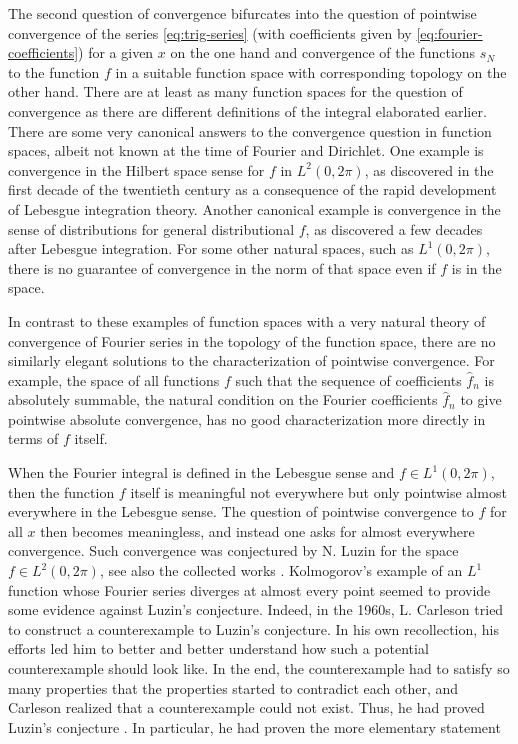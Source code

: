 The second question of convergence bifurcates into the question of pointwise convergence
of the series \eqref{eq:trig-series} (with coefficients given by \eqref{eq:fourier-coefficients}) for a given $x$ on the one hand and convergence of the functions $s_N$ to the function $f$ in a suitable
function space with corresponding topology on the other hand. There are at
least as many function spaces for
the question of convergence as there are different definitions of the integral elaborated earlier.
There are some very
canonical answers to the convergence question in function spaces, albeit not known at the time of Fourier and Dirichlet.
One example is convergence in the Hilbert space sense for $f$ in $L^2(0,2\pi)$,
as discovered in the first decade of the twentieth century
as a consequence of the rapid development of Lebesgue integration theory.
Another canonical example is convergence in the sense of distributions for general distributional $f$, as discovered a few decades after Lebesgue integration. For some other natural spaces, such as $L^1(0,2\pi)$, there is no guarantee of convergence in the
norm of that space even if $f$ is in the space.


In contrast to these examples of function spaces with a very natural theory of
convergence of Fourier series in the topology of the function space, there are no similarly elegant solutions to the
characterization of pointwise convergence.
For example, the space of all functions $f$ such that the sequence of coefficients $\widehat{f}_n$ is absolutely summable, the natural condition on the Fourier coefficients $\widehat{f}_n$ to give pointwise absolute convergence,
has no good characterization more
directly in terms of $f$ itself.


When the Fourier integral is defined in the Lebesgue sense and
$f\in L^1(0,2\pi)$, then the function
$f$ itself is meaningful not everywhere but only pointwise almost everywhere
in the Lebesgue sense. The question of pointwise convergence to $f$ for all $x$ then becomes
meaningless, and instead one asks for almost everywhere convergence.
Such convergence
was conjectured by N. Luzin \cite{Luzin13}
for the space
$f\in L^2(0,2\pi)$, see also the collected works \cite{Luzin53}. Kolmogorov's example \cite{Kolmogorov} of an $L^1$ function whose Fourier series diverges at almost every point seemed to provide some evidence against Luzin's conjecture.
Indeed, in the 1960s, L. Carleson tried to construct a counterexample to Luzin's conjecture.
In his own recollection, his efforts led him to better and better understand how such a potential counterexample should look like.
In the end, the counterexample had to satisfy so many properties that the properties started to contradict each other,
and Carleson realized that a counterexample could not exist.
Thus, he had proved Luzin's conjecture \cite{carleson}.
In particular, he had proven the more elementary statement

